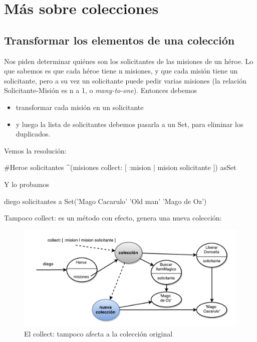 \documentclass[a4paper,12pt]{book}
\begin{document}
\section{Más sobre colecciones}

\subsection{Transformar los elementos de una colección}
Nos piden determinar quiénes son los solicitantes de las misiones de un héroe. Lo que sabemos es que cada
héroe tiene n misiones, y que cada misión tiene un solicitante, pero a su vez un solicitante puede pedir
varias misiones (la relación Solicitante-Misión es n a 1, o \textit{many-to-one}).
\newline
\newline
Entonces debemos
\begin{itemize}
 \item transformar cada misión en un solicitante
 \item y luego la lista de solicitantes debemos pasarla a un Set, para eliminar los duplicados.
\end{itemize}

Vemos la resolución:

\begin{code}
#Heroe
solicitantes
   ^(misiones collect: [ :mision | mision solicitante ]) asSet
\end{code}

Y lo probamos 

\begin{code}
diego solicitantes
   a Set('Mago Cacarulo' 'Old man' 'Mago de Oz')
\end{code}

Tampoco collect: es un método con efecto, genera una nueva colección:

\begin{figure}[h!]
    \centering
    \includegraphics[width=1.1\textwidth]{images/21_Collect_sin_efecto.pdf}
    \caption{El collect: tampoco afecta a la colección original}
\end{figure}
\end{document}
